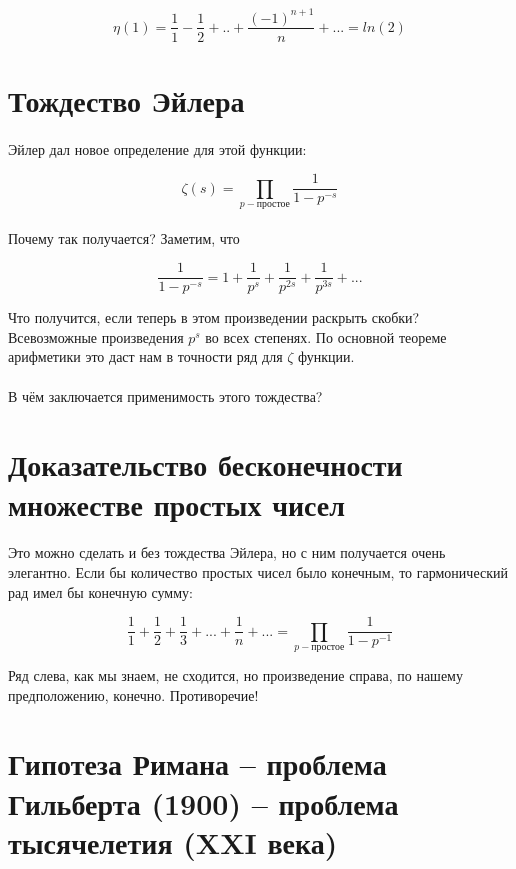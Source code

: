 \documentclass{article}
\begin{document}
\[ \eta(1) = \frac{1}{1} - \frac{1}{2} + .. + \frac{(-1)^{n+1}}{n} + ... = ln(2) \]

\section{Тождество Эйлера}

\paragraph{}
Эйлер дал новое определение для этой функции:

\[ \zeta(s) = \prod_{p - \text{простое}} \frac{1}{1 - p^{-s}} \]

\paragraph{}
Почему так получается? Заметим, что 

\[ \frac{1}{1 - p^{-s}} = 1 + \frac{1}{p^s} + \frac{1}{p^{2s}} + \frac{1}{p^{3s}} + ... \]

Что получится, если теперь в этом произведении раскрыть скобки?
Всевозможные произведения $p^s$ во всех степенях. По основной теореме арифметики
это даст нам в точности ряд для $\zeta$ функции.

\paragraph{}
В чём заключается применимость этого тождества?

\section{Доказательство бесконечности множестве простых чисел}

\paragraph{}
Это можно сделать и без тождества Эйлера, но с ним получается очень элегантно. Если бы количество простых чисел было конечным, то гармонический рад имел бы
конечную сумму:

$$
    \frac{1}{1} + \frac{1}{2} + \frac{1}{3}  + ... + \frac{1}{n} + ...
    = \prod_{p - \text{простое}} \frac{1}{1 - p^{-1}}
$$

Ряд слева, как мы знаем, не сходится, но произведение справа, по нашему предположению,
конечно. Противоречие!

\section{Гипотеза Римана -- проблема Гильберта (1900) -- проблема тысячелетия (XXI века)}
\end{document}

